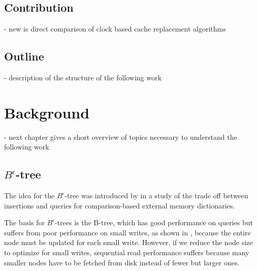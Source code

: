 \documentclass[
	12pt,
	a4paper,
	abstract,
	bibliography=totoc,
	chapterprefix,
	headings=openright,
	numbers=endperiod,
	parskip=half,
	twoside,
]{scrreprt}
\begin{document}

\section{Contribution}
- new is direct comparison of clock based cache replacement algorithms\\

\section{Outline}
- description of the structure of the following work\\


\chapter{Background}
\label{cha:background}


- next chapter gives a short overview of topics necessary to understand the following work\\

\section{$B^{\epsilon}$-tree}


The idea for the $B^{\epsilon}$-tree was introduced by \cite{brodal2003lower} in a study of the trade off between insertions and queries for comparison-based external memory dictionaries.

The basis for $B^{\epsilon}$-trees is the B-tree, which has good performance on queries but suffers from poor performance on small writes, as shown in \cite{bender2015introduction}, 
because the entire node must be updated for each small write.
However, if we reduce the node size to optimize for small writes, sequential read performance suffers because many smaller nodes have to be fetched from disk instead of fewer but larger ones.
\end{document}
